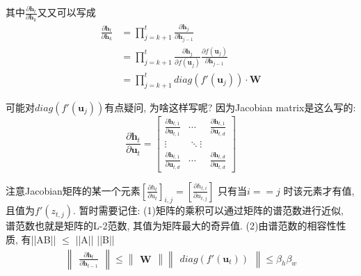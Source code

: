 \documentclass{article}
\begin{document}
其中$\frac{\partial \textbf{h}_t}{\partial \textbf{h}_k}$又又可以写成
\begin{align}
    \frac{\partial \textbf{h}_t}{\partial \textbf{h}_k} & = \prod_{j=k+1}^{t} \frac{\partial \textbf{h}_j}{\partial \textbf{h}_{j-1}}  \\
                                                        & = \prod_{j=k+1}^{t} \frac{\partial \textbf{h}_j}{\partial f(\textbf{u}_{j})}
    \frac{\partial f(\textbf{u}_{j})}{\partial \textbf{h}_{j-1}}                                                                       \\
                                                        & = \prod_{j=k+1}^{t} diag(f'(\textbf{u}_{j})) \cdot \textbf{W}
\end{align}

可能对$diag(f'(\textbf{u}_{j}))$有点疑问, 为啥这样写呢? 因为Jacobian matrix是这么写的:
\begin{equation*}
    \frac{\partial \textbf{h}_t}{\partial \textbf{u}_t} =
    \begin{bmatrix}
        \frac{\partial \textbf{h}_{t,1}}{\partial \textbf{u}_{t,1}} & \cdots        & \frac{\partial \textbf{h}_{t,1}}{\partial \textbf{u}_{t,d}} \\
        \vdots                                                      & \ddots \vdots                                                               \\
        \frac{\partial \textbf{h}_{t,1}}{\partial \textbf{u}_{t,d}} & \cdots        & \frac{\partial \textbf{h}_{t,d}}{\partial \textbf{u}_{t,d}}
    \end{bmatrix}
\end{equation*}

注意Jacobian矩阵的某一个元素$\left[\frac{\partial {h}_{t}}{\partial {u}_{t}}\right]_{i,j} = \left[\frac{\partial {h}_{t,i}}{\partial {u}_{t,j}}\right]$
只有当$i == j$ 时该元素才有值, 且值为$f'(z_{t,j})$.
暂时需要记住: (1)矩阵的乘积可以通过矩阵的谱范数进行近似, 谱范数也就是矩阵的L-2范数, 其值为矩阵最大的奇异值.
(2)由谱范数的相容性性质, 有||AB|| $\leq$ ||A|| ||B||
\begin{align*}
    \begin{Vmatrix}
        \frac{\partial \textbf{h}_t}{\partial \textbf{h}_{t-1}}
    \end{Vmatrix}
    \leq
    \begin{Vmatrix}
        \textbf{W}
    \end{Vmatrix}
    \begin{Vmatrix}
        diag(f'( \textbf{u}_t ))
    \end{Vmatrix}
    \leq \beta_h \beta_w
\end{align*}
\end{document}
